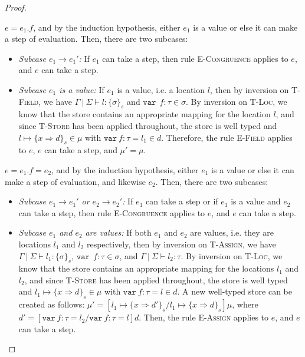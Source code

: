 \documentclass{llncs}
\newcommand{\keywadj}[1]{\mathtt{#1}}
\newcommand{\keyw}[1]{\keywadj{#1}~}
\newcommand{\pcase}[1][]{
  \if\relax\detokenize{#1}\relax
    \def\thiscase{}
  \else
    \def\thiscase{~#1}
  \fi
  \item
}
\begin{document}
\begin{proof}
\begin{pcases}
\pcase[\textsc{T-Field}]
$e = e_1.f$, and by the induction hypothesis, either $e_1$ is a value or else it can make a step of evaluation. Then, there are two subcases:
\\
\begin{itemize}
\item[]  \textit{Subcase $e_1 \longrightarrow e_1'$:} If $e_1$ can take a step, then rule \textsc{E-Congruence} applies to $e$, and $e$ can take a step.
\\
\item[]  \textit{Subcase $e_1$ is a value:} If $e_1$ is a value, i.e. a location $l$, then by inversion on \textsc{T-Field}, we have $\Gamma~|~\Sigma \vdash l : \{\sigma\}_s$ and $\keyw{var}~ f : \tau \in \sigma
$. By inversion on \textsc{T-Loc}, we know that the store contains an appropriate mapping for the location $l$, and since \textsc{T-Store} has been applied throughout, the store is well typed and $l \mapsto \{ x \Rightarrow d \}_{s} \in \mu$ with $\keyw{var} f : \tau = l_1 \in d$. Therefore, the rule \textsc{E-Field} applies to $e$, $e$ can take a step, and $\mu' = \mu$.
\\
\end{itemize}

\pcase[\textsc{T-Assign}]
$e = e_1.f=e_2$, and by the induction hypothesis, either $e_1$ is a value or else it can make a step of evaluation, and likewise $e_2$. Then, there are two subcases:
\\
\begin{itemize}
\item[]  \textit{Subcase $e_1 \longrightarrow e_1'$ or $e_2 \longrightarrow e_2'$:} If $e_1$ can take a step or if $e_1$ is a value and $e_2$ can take a step, then rule \textsc{E-Congruence} applies to $e$, and $e$ can take a step.
\\
\item[]  \textit{Subcase $e_1$ and $e_2$ are values:} If both $e_1$ and $e_2$ are values, i.e. they are locations $l_1$ and $l_2$ respectively, then by inversion on \textsc{T-Assign}, we have $\Gamma~|~\Sigma \vdash l_1 : \{\sigma\}_s$, $\keyw{var}~ f:\tau \in \sigma$, and $\Gamma~|~\Sigma \vdash l_2 : \tau$. By inversion on \textsc{T-Loc}, we know that the store contains an appropriate mapping for the locations $l_1$ and $l_2$, and 
since \textsc{T-Store} has been applied throughout, the store is well typed and $l_1 \mapsto \{ x \Rightarrow d \}_{s} \in \mu$ with $\keyw{var} f:\tau = l \in d$. A new well-typed store can be created as follows: $\mu' = [l_1 \mapsto \{ x \Rightarrow d' \}_{s}/l_1 \mapsto \{ x \Rightarrow d \}_{s}]\mu$, where $d' = [\keyw{var} f:\tau = l_2/\keyw{var} f:\tau = l]d$. Then, the rule \textsc{E-Assign} applies to $e$, and $e$ can take a step.
\\
\end{itemize}


\end{pcases}
\end{proof}
\end{document}

